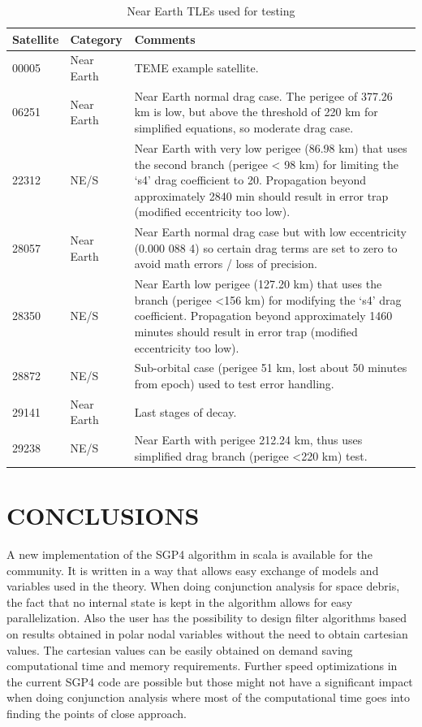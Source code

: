 \documentclass{article}
\begin{document}
\begin{table}[p]
\centering
\caption{Near Earth TLEs used for testing}\vspace{2mm}
\begin{tabular}{|l|l|p{14cm}|}
\hline\hline
Satellite & Category & Comments\\
\hline
00005 & Near Earth & TEME example satellite.\\
06251 &  Near Earth  & Near Earth normal drag case. The perigee of 377.26 km is low, but above the threshold of 220
km for simplified equations, so moderate drag case.\\
22312  & NE/S  & Near Earth with very low perigee (86.98 km) that uses the second branch (perigee < 98 km)
for limiting the ‘s4’ drag coefficient to 20. Propagation beyond approximately 2840 min
should result in error trap (modified eccentricity too low).\\
28057 &  Near Earth  & Near Earth normal drag case but with low eccentricity (0.000 088 4) so certain drag terms are
set to zero to avoid math errors / loss of precision.\\
28350 & NE/S  & Near Earth low perigee (127.20 km) that uses the branch (perigee \textless 156 km) for modifying
the ‘s4’ drag coefficient. Propagation beyond approximately 1460 minutes should result in
error trap (modified eccentricity too low).\\
28872  & NE/S  & Sub-orbital case (perigee 51 km, lost about 50 minutes from epoch) used to test error handling.\\
29141  & Near Earth  & Last stages of decay.\\
29238  & NE/S  & Near Earth with perigee 212.24 km, thus uses simplified drag branch (perigee \textless 220 km) test.\\
\hline\hline
\end{tabular}
\label{tab:res}
\end{table}

\section{CONCLUSIONS}
\label{sec:conclusions}

A new implementation of the SGP4 algorithm in scala is available for the community. It is
written in a way that allows easy exchange of models and variables used in the theory.
When doing conjunction analysis for space debris, the fact that no internal state is kept in the algorithm allows for easy
parallelization. Also the user has the possibility to design
filter algorithms based on results obtained in polar nodal variables without
the need to obtain cartesian values. The cartesian values can be easily obtained on demand
saving computational time and memory requirements. Further speed optimizations in the current
SGP4 code are possible but those might not have a significant impact when doing conjunction analysis
where most of the computational time goes into finding the points of close approach.
\end{document}
